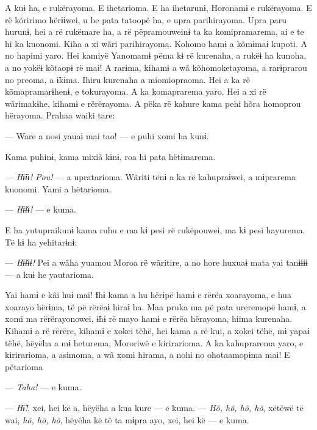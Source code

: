 A kuɨ ha, e rukërayoma. E ihetarioma. E ha ihetarunɨ, Horonamɨ e
rukërayoma. E rë kõririmo hërɨɨwei, u he pata tatoopë ha, e upra
parihirayoma. Upra paru hurunɨ, hei a rë rukëmare ha, a rë pëpramouweinɨ
ta ka komipramarema, ai e te hi ka kuonomi. Kiha a xi wãri parihirayoma.
Kohomo hamɨ a kõmɨmaɨ kupoti. A no hapimi yaro. Hei kamiyë Yanomamɨ pëma
kɨ rë kurenaha, a rukëɨ ha kunoha, a no yokëɨ kõtaopɨ rë mai! A rarɨma,
kihamɨ a wã kõhomoketayoma, a rarɨprarou no preoma, a ɨ̃kɨma. Ihiru
kurenaha a miomiopraoma. Hei a ka rë kõmapramarɨhenɨ, e tokurayoma. A ka
komaprarema yaro. Hei a xi rë wãrimakɨhe, kihamɨ e rërërayoma. A pëka rë
kahure kama pehi hõra homoprou hërayoma. Prahaa waiki tare: 

--- Ware a nosi yauaɨ mai tao! --- e puhi xomi ha kunɨ. 

Kama puhinɨ, kama mixiã kɨnɨ, roa hi pata hëtɨmarema. 

--- \textit{Hɨ̃ɨɨ! Pou!} --- a upratarioma. Wãriti tënɨ a ka rë kahupraɨwei, a
mɨprarema kuonomi. Yami a hëtarioma. 

--- \textit{Hɨ̃ɨɨ!} --- e kuma. 

E ha yutupraikunɨ kama ruhu e ma kɨ pesi rë rukëpouwei, ma kɨ pesi
hayurema. Të kɨ ha yehitarɨnɨ: 

--- \textit{Hɨ̃ɨɨɨ!} Pei a wãha yuamou Moroa rë wãritire, a no hore huxuaɨ mata yai
tanɨɨɨɨ --- a kuɨ he yautarioma. 

Yai hamɨ e kãi huɨ mai! Ɨhɨ kama a hu hërɨpë hamɨ e rërëa xoarayoma, e
hua xoarayo hërɨma, të pë rërëaɨ hiraɨ ha. Maa pruka ma pë pata
ureremopë hamɨ, a xomi ma rërërayonowei, ɨ̃hɨ rë mayo hamɨ e rërëa
hërayoma, hiima kurenaha. Kihamɨ a rë rërëre, kihamɨ e xokei tëhë, hei
kama a rë kui, a xokei tëhë, mɨ yapaɨ tëhë, hëyëha a mɨ heturema,
Mororiwë e kirirarioma. A ka kahuprarema yaro, e kirirarioma, a asimoma,
a wã xomi hirama, a nohi no ohotaamopɨma mai! E pëtarioma 

--- \textit{Taha!} --- e kuma. 


--- \textit{Hɨ̃!}, xei, hei kë a, hëyëha a kua kure --- e kuma. --- \textit{Hõ, hõ, hõ, hõ},
xëtëwë të wai, \textit{hõ, hõ, hõ}, hëyëha kë të ta mɨpra ayo, xei, hei kë --- e
kuma. 

